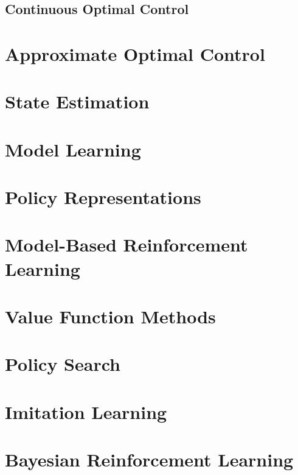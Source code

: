 		\subsection{Continuous Optimal Control} %

	\section{Approximate Optimal Control} %

	\section{State Estimation} %

	\section{Model Learning} %

	\section{Policy Representations} %

	\section{Model-Based Reinforcement Learning} %

	\section{Value Function Methods} %

	\section{Policy Search} %

	\section{Imitation Learning} %

	\section{Bayesian Reinforcement Learning} %
